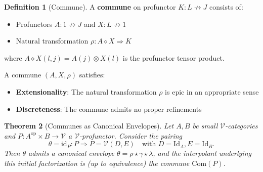 \documentclass[11pt]{article}
\theoremstyle{plain}
\newtheorem{theorem}{Theorem}[section]
\theoremstyle{definition}
\newtheorem{definition}[theorem]{Definition}
\theoremstyle{remark}
\newcommand{\V}{\mathcal{V}}
\newcommand{\op}{\mathrm{op}}
\begin{document}
\begin{definition}[Commune]
A \textbf{commune} on profunctor $K : L \not\to J$ consists of:
\begin{itemize}
\item Profunctors $A : 1 \not\to J$ and $X : L \not\to 1$
\item Natural transformation $\rho : A \diamond X \Rightarrow K$
\end{itemize}
where $A \diamond X(l, j) = A(j) \otimes X(l)$ is the profunctor tensor product.

\begin{center}
\end{center}

A commune $(A, X, \rho)$ satisfies:
\begin{itemize}
\item \textbf{Extensionality}: The natural transformation $\rho$ is epic in an appropriate sense
\item \textbf{Discreteness}: The commune admits no proper refinements
\end{itemize}
\end{definition}

\begin{theorem}[Communes as Canonical Envelopes]
Let $A, B$ be small $\V$-categories and $P : A^{\op} \times B \to \V$ a $\V$-profunctor. Consider the pairing
$$
\theta = \mathrm{id}_P : P \Rightarrow P = \V(D, E) \quad \text{with } D = \mathrm{Id}_A, E = \mathrm{Id}_B.
$$
Then $\theta$ admits a canonical envelope $\theta = \rho \star \gamma \star \lambda$, and the interpolant underlying this initial factorization is (up to equivalence) the commune $\mathrm{Com}(P)$.
\end{theorem}
\end{document}
